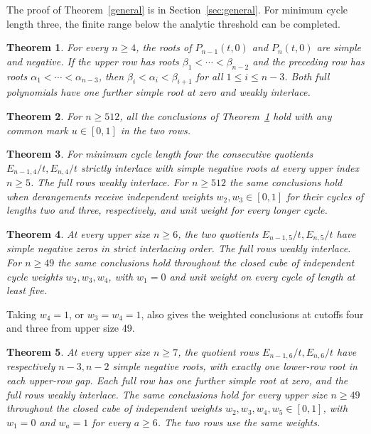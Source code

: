 \documentclass[11pt]{article}
\newtheorem{theorem}{Theorem}
\begin{document}
The proof of Theorem~\ref{general} is in Section~\ref{sec:general}. For minimum cycle length three, the finite range below the analytic threshold can be completed.
\begin{theorem}\label{main}
For every \(n\ge4\), the roots of \(P_{n-1}(t,0)\) and \(P_n(t,0)\) are simple and negative. If the upper row has roots \(\beta_1<\cdots<\beta_{n-2}\) and the preceding row has roots \(\alpha_1<\cdots<\alpha_{n-3}\), then \(\beta_i<\alpha_i<\beta_{i+1}\) for all \(1\le i\le n-3\). Both full polynomials have one further simple root at zero and weakly interlace.
\end{theorem}
\begin{theorem}\label{family}
For \(n\ge512\), all the conclusions of Theorem~\ref{main} hold with any common mark \(u\in[0,1]\) in the two rows.
\end{theorem}
\begin{theorem}\label{four}
For minimum cycle length four the consecutive quotients \(E_{n-1,4}/t,E_{n,4}/t\) strictly interlace with simple negative roots at every upper index \(n\ge5\). The full rows weakly interlace. For \(n\ge512\) the same conclusions hold when derangements receive independent weights \(w_2,w_3\in[0,1]\) for their cycles of lengths two and three, respectively, and unit weight for every longer cycle.
\end{theorem}
\begin{theorem}\label{five}
At every upper size \(n\ge6\), the two quotients \(E_{n-1,5}/t,E_{n,5}/t\) have simple negative zeros in strict interlacing order. The full rows weakly interlace. For \(n\ge49\) the same conclusions hold throughout the closed cube of independent cycle weights \(w_2,w_3,w_4\), with \(w_1=0\) and unit weight on every cycle of length at least five.
\end{theorem}
Taking \(w_4=1\), or \(w_3=w_4=1\), also gives the weighted conclusions at cutoffs four and three from upper size 49.
\begin{theorem}\label{six}
At every upper size \(n\ge7\), the quotient rows \(E_{n-1,6}/t,E_{n,6}/t\) have respectively \(n-3,n-2\) simple negative roots, with exactly one lower-row root in each upper-row gap. Each full row has one further simple root at zero, and the full rows weakly interlace. The same conclusions hold for every upper size \(n\ge49\) throughout the closed cube of independent weights \(w_2,w_3,w_4,w_5\in[0,1]\), with \(w_1=0\) and \(w_a=1\) for every \(a\ge6\). The two rows use the same weights.
\end{theorem}
\end{document}
